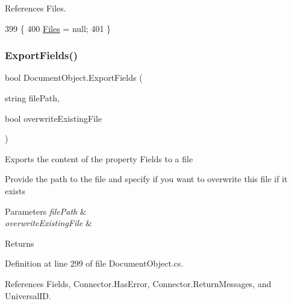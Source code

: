 References Files.


\begin{DoxyCode}
399                              \{
400         \mbox{\hyperlink{class_document_object_afe6bcf5175607f91dde768491f23a0a4}{Files}} = null;
401     \}
\end{DoxyCode}
\mbox{\label{class_document_object_a1a763aa01710b370634f46c89b7d2d8e}} 
\subsubsection{\texorpdfstring{Export\+Fields()}{ExportFields()}}
{\footnotesize\ttfamily bool Document\+Object.\+Export\+Fields (\begin{DoxyParamCaption}\item[{string}]{file\+Path,  }\item[{bool}]{overwrite\+Existing\+File }\end{DoxyParamCaption})}



Exports the content of the property \textquotesingle{}Fields\textquotesingle{} to a file 

Provide the path to the file and specify if you want to overwrite this file if it exists


\begin{DoxyParams}{Parameters}
{\em file\+Path} & \\
\hline
{\em overwrite\+Existing\+File} & \\
\hline
\end{DoxyParams}
\begin{DoxyReturn}{Returns}

\end{DoxyReturn}


Definition at line 299 of file Document\+Object.\+cs.



References Fields, Connector.\+Has\+Error, Connector.\+Return\+Messages, and Universal\+ID.


